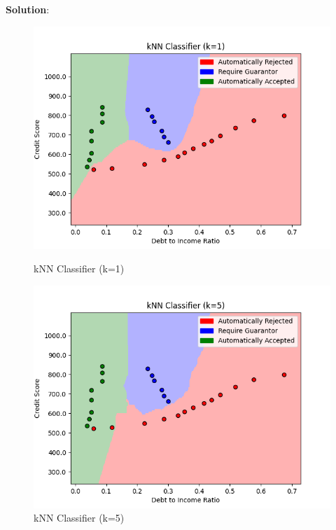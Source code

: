 \documentclass[submit]{../harvardml}
\newenvironment{solution}{
    \vspace{2mm}
    \color{blue}\noindent\textbf{Solution}:
}{}
\begin{document}
\begin{solution}
\begin{tcolorbox}[colback=white,breakable]
  \begin{figure}[H]
      \centering
      \begin{minipage}[b]{0.48\textwidth}
          \includegraphics[width=\textwidth]{img_output/kNN Classifier (k=1).png}
          \caption{kNN Classifier (k=1)}
      \end{minipage}
      \hfill
      \begin{minipage}[b]{0.48\textwidth}
          \includegraphics[width=\textwidth]{img_output/kNN Classifier (k=5).png}
          \caption{kNN Classifier (k=5)}
      \end{minipage}
  \end{figure}
  

\end{tcolorbox}
\end{solution}
\end{document}
